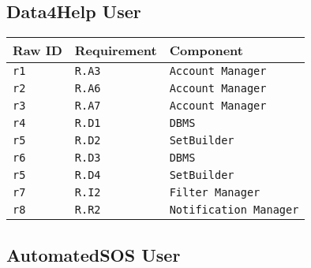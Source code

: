 \documentclass[../DD0.tex]{subfiles}
\begin{document}
\subsection{Data4Help User}

    \begin{table}[h!]

      \centering
      \begin{tabularx}{.8\linewidth}{|X|X|X|}
        \hline
        \textbf{Raw ID} & \textbf{Requirement} & \textbf{Component} \\ \hline
        \texttt{r1} & \texttt{R.A3} & \texttt{Account Manager} \\
        \hline
        \texttt{r2} & \texttt{R.A6} & \texttt{Account Manager} \\
        \hline
        \texttt{r3} & \texttt{R.A7} & \texttt{Account Manager} \\
        \hline
        \texttt{r4} & \texttt{R.D1}  & \texttt{DBMS} \\
        \hline
        \texttt{r5} & \texttt{R.D2}  & \texttt{SetBuilder} \\
        \hline
        \texttt{r6} & \texttt{R.D3}  & \texttt{DBMS} \\
        \hline
        \texttt{r5} & \texttt{R.D4}  & \texttt{SetBuilder} \\
        \hline
        \texttt{r7} & \texttt{R.I2}  & \texttt{Filter Manager} \\
        \hline
        \texttt{r8} & \texttt{R.R2} & \texttt{Notification Manager} \\
        \hline
      \end{tabularx}
      \label{tab:datauser}

    \end{table}

\subsection{AutomatedSOS User}
\end{document}
